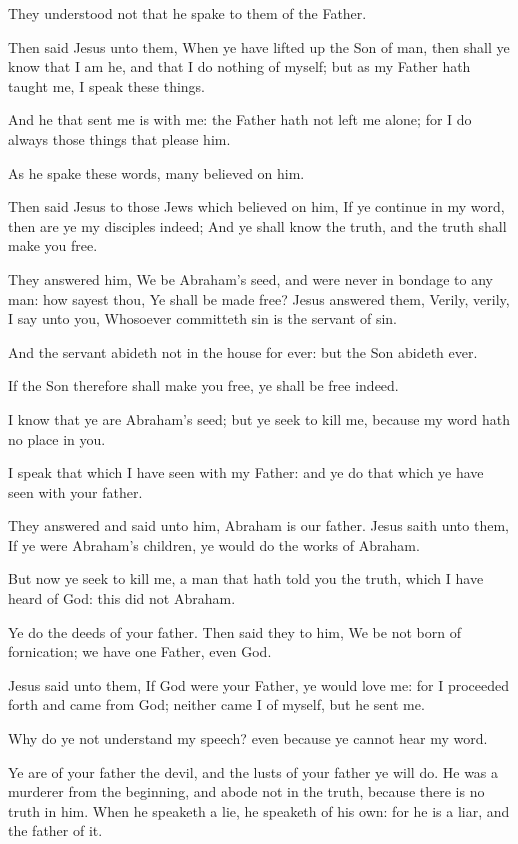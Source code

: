 \verse They understood not that he spake to them of the Father.

\verse Then said Jesus unto them, When ye have lifted up the Son of man, then shall ye know that I am he, and that I do nothing of myself; but as my Father hath taught me, I speak these things.

\verse And he that sent me is with me: the Father hath not left me alone; for I do always those things that please him.

\verse As he spake these words, many believed on him.

\verse Then said Jesus to those Jews which believed on him, If ye continue in my word, then are ye my disciples indeed; \verse And ye shall know the truth, and the truth shall make you free.

\verse They answered him, We be Abraham's seed, and were never in bondage to any man: how sayest thou, Ye shall be made free?  \verse Jesus answered them, Verily, verily, I say unto you, Whosoever committeth sin is the servant of sin.

\verse And the servant abideth not in the house for ever: but the Son abideth ever.

\verse If the Son therefore shall make you free, ye shall be free indeed.

\verse I know that ye are Abraham's seed; but ye seek to kill me, because my word hath no place in you.

\verse I speak that which I have seen with my Father: and ye do that which ye have seen with your father.

\verse They answered and said unto him, Abraham is our father. Jesus saith unto them, If ye were Abraham's children, ye would do the works of Abraham.

\verse But now ye seek to kill me, a man that hath told you the truth, which I have heard of God: this did not Abraham.

\verse Ye do the deeds of your father. Then said they to him, We be not born of fornication; we have one Father, even God.

\verse Jesus said unto them, If God were your Father, ye would love me: for I proceeded forth and came from God; neither came I of myself, but he sent me.

\verse Why do ye not understand my speech? even because ye cannot hear my word.

\verse Ye are of your father the devil, and the lusts of your father ye will do. He was a murderer from the beginning, and abode not in the truth, because there is no truth in him. When he speaketh a lie, he speaketh of his own: for he is a liar, and the father of it.


